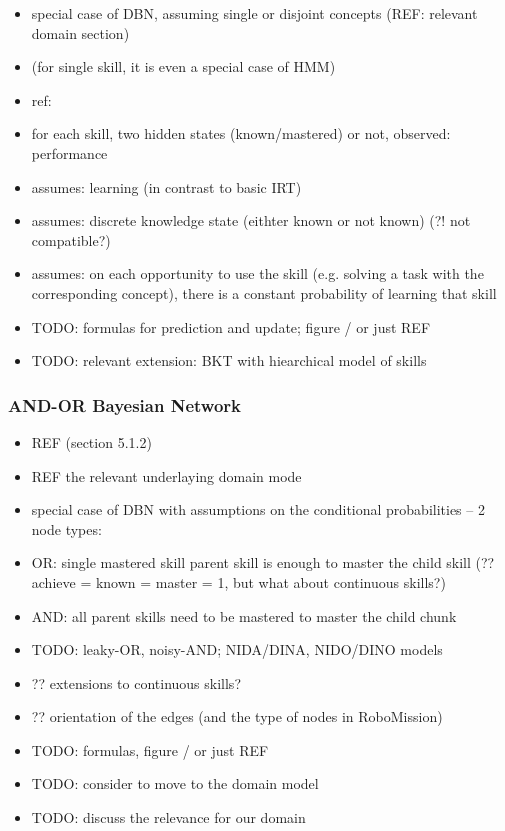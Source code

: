 \begin{itemize}
\item special case of DBN, assuming single or disjoint concepts (REF: relevant domain section)
\item (for single skill, it is even a special case of HMM)
\item ref: \cite{bkt} %
\item for each skill, two hidden states (known/mastered) or not, observed: performance
\item assumes: learning (in contrast to basic IRT)
\item assumes: discrete knowledge state (eithter known or not known) (?! not compatible?)
\item assumes: on each opportunity to use the skill (e.g. solving a task with
  the corresponding concept), there is a constant probability of learning that skill
\item TODO: formulas for prediction and update; figure / or just REF
\item TODO: relevant extension: BKT with hiearchical model of skills
\end{itemize}


\subsubsection{AND-OR Bayesian Network}

\begin{itemize}
\item REF \cite{student-models-review-2012} (section 5.1.2)
\item REF the relevant underlaying domain mode
\item special case of DBN with assumptions on the conditional probabilities -- 2 node types:
\item OR: single mastered skill parent skill is enough to master the child skill
  (?? achieve = known = master = 1, but what about continuous skills?)
\item AND: all parent skills need to be mastered to master the child chunk
\item TODO: leaky-OR, noisy-AND; NIDA/DINA, NIDO/DINO models
\item ?? extensions to continuous skills?
\item ?? orientation of the edges (and the type of nodes in RoboMission)
\item TODO: formulas, figure / or just REF
\item TODO: consider to move to the domain model
\item TODO: discuss the relevance for our domain
\end{itemize}

